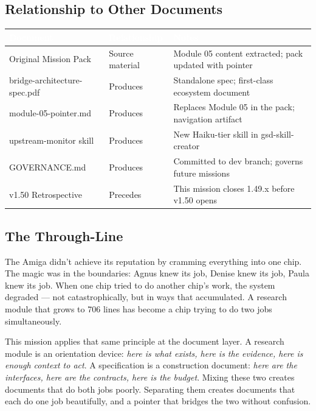 \documentclass[11pt,letterpaper]{article}
\newcommand{\tableheader}[1]{\textbf{\sffamily\textcolor{white}{#1}}}
\begin{document}
\subsection{Relationship to Other Documents}

\begin{center}
\begin{tabularx}{\textwidth}{L{4.5cm}L{2.5cm}X}
\toprule
{}
\tableheader{Document} & \tableheader{Relationship} & \tableheader{Notes} \\
\midrule
Original Mission Pack & Source material & Module 05 content extracted; pack updated with pointer \\
bridge-architecture-spec.pdf & Produces & Standalone spec; first-class ecosystem document \\
module-05-pointer.md & Produces & Replaces Module 05 in the pack; navigation artifact \\
upstream-monitor skill & Produces & New Haiku-tier skill in gsd-skill-creator \\
GOVERNANCE.md & Produces & Committed to dev branch; governs future missions \\
v1.50 Retrospective & Precedes & This mission closes 1.49.x before v1.50 opens \\
\bottomrule
\end{tabularx}
\end{center}

\subsection{The Through-Line}

The Amiga didn't achieve its reputation by cramming everything into one chip. The magic was in the boundaries: Agnus knew its job, Denise knew its job, Paula knew its job. When one chip tried to do another chip's work, the system degraded --- not catastrophically, but in ways that accumulated. A research module that grows to 706 lines has become a chip trying to do two jobs simultaneously.

This mission applies that same principle at the document layer. A research module is an orientation device: \emph{here is what exists, here is the evidence, here is enough context to act}. A specification is a construction document: \emph{here are the interfaces, here are the contracts, here is the budget}. Mixing these two creates documents that do both jobs poorly. Separating them creates documents that each do one job beautifully, and a pointer that bridges the two without confusion.
\end{document}
